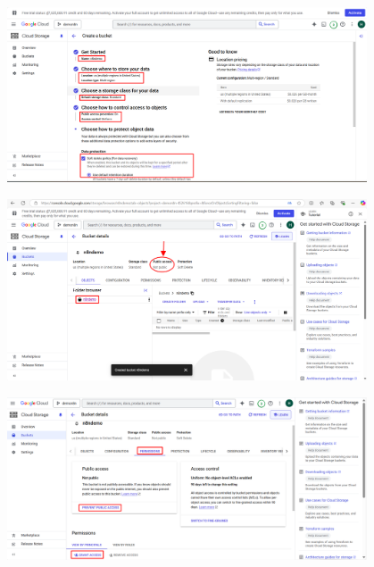 \begin{itemize}[label=]
\begin{figure}[H]
    \end{figure}
    \begin{figure}[H]
    \centering
    \includegraphics[width=0.95\textwidth]{images/GGcloud-6.png}
    
    \end{figure}
    \begin{figure}[H]
    \centering
    \includegraphics[width=0.95\textwidth]{images/GGcloud-7.png}
    
    \end{figure}
    \begin{figure}[H]
    \centering
    \includegraphics[width=0.95\textwidth]{images/GGcloud-8.png}
    

\end{figure}
\end{itemize}
